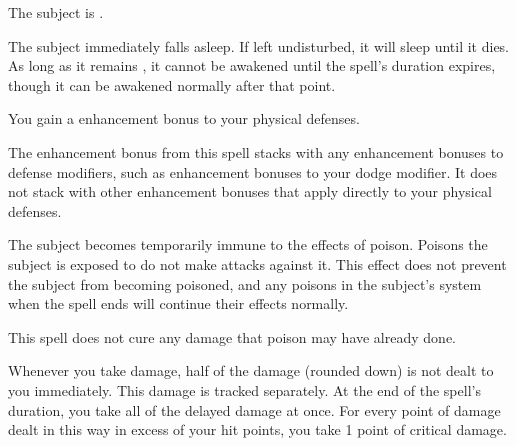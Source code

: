 \spelldur{\durlong}
\begin{spellhealthy}
    The subject is \bewildered.
\end{spellhealthy}
\begin{spellblood}
    The subject immediately falls asleep. If left undisturbed, it will sleep until it dies. As long as it remains \bloodied, it cannot be awakened until the spell's duration expires, though it can be awakened normally after that point.
\end{spellblood}

\spelldur{\durlong}
\begin{spelleffect}
    You gain a  enhancement bonus to your physical defenses. \spellbonusscalingdescription
\end{spelleffect}
\begin{spellnotes}
    The enhancement bonus from this spell stacks with any enhancement bonuses to defense modifiers, such as enhancement bonuses to your dodge modifier. It does not stack with other enhancement bonuses that apply directly to your physical defenses. 
\end{spellnotes}

\spelldur{\durshort}
\begin{spelleffect}
    The subject becomes temporarily immune to the effects of poison. Poisons the subject is exposed to do not make attacks against it. This effect does not prevent the subject from becoming poisoned, and any poisons in the subject's system when the spell ends will continue their effects normally. 
\end{spelleffect}
\begin{spellnotes}
    This spell does not cure any damage that poison may have already done.
\end{spellnotes}

\spelldur{\durmed}
\begin{spelleffect}
    Whenever you take damage, half of the damage (rounded down) is not dealt to you immediately. This damage is tracked separately. At the end of the spell's duration, you take all of the delayed damage at once. For every point of damage dealt in this way in excess of your hit points, you take 1 point of critical damage.
\end{spelleffect}

